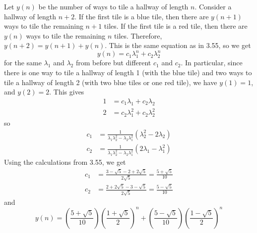 \documentclass[newpage]{homework}
\begin{document}
	
	
	Let $y(n)$ be the number of ways to tile a hallway of length $n$. Consider a hallway of length $n+2$. If the first tile is a blue tile, then there are $y(n+1)$ ways to tile the remaining $n+1$ tiles. If the first tile is a red tile, then there are $y(n)$ ways to tile the remaining $n$ tiles. Therefore, $y(n+2) = y(n+1) + y(n)$. This is the same equation as in 3.55, so we get
	\begin{equation*}
		y(n) = c_1\lambda_1^n + c_2\lambda_2^n
	\end{equation*}
	for the same $\lambda_1$ and $\lambda_2$ from before but different $c_1$ and $c_2$. In particular, since there is one way to tile a hallway of length 1 (with the blue tile) and two ways to tile a hallway of length 2 (with two blue tiles or one red tile), we have $y(1) = 1$, and $y(2) = 2$. This gives
	\begin{equation*}
		\begin{aligned}
			1 &= c_1\lambda_1 + c_2\lambda_2 \\
			2 &= c_2\lambda_1^2 + c_2\lambda_2^2
		\end{aligned}
	\end{equation*}
	so
	\begin{equation*}
		\begin{aligned}
			c_1 &= \frac{1}{\lambda_1\lambda_2^2 - \lambda_2\lambda_1^2}(\lambda_2^2 - 2\lambda_2)\\
			c_2 &= \frac{1}{\lambda_1\lambda_2^2 - \lambda_2\lambda_1^2}(2\lambda_1 - \lambda_1^2)
		\end{aligned}
	\end{equation*}
	Using the calculations from 3.55, we get
	\begin{equation*}
		\begin{aligned}
			c_1 &= \frac{3-\sqrt{5} - 2 + 2\sqrt{5}}{2\sqrt{5}}=\frac{5 + \sqrt{5}}{10}\\
			c_2 &=\frac{2+2\sqrt{5} - 3 -\sqrt{5}}{2\sqrt{5}} =\frac{5-\sqrt{5}}{10}
		\end{aligned}
	\end{equation*}
	and
	\begin{equation*}
		y(n) = \left(\frac{5 + \sqrt{5}}{10}\right)\left(\frac{1+\sqrt{5}}{2}\right)^n + 	\left(\frac{5-\sqrt{5}}{10}\right)\left(\frac{1-\sqrt{5}}{2}\right)^n
	\end{equation*}
	
	
\end{document}
